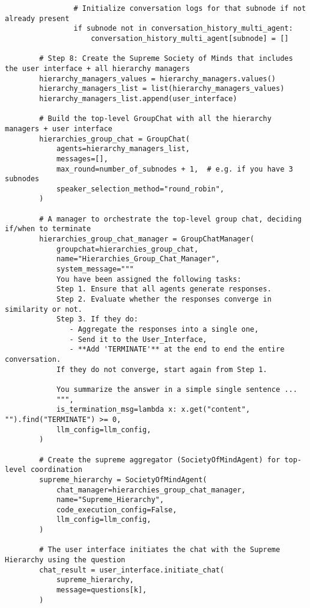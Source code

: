 \begin{lstlisting}
                # Initialize conversation logs for that subnode if not already present
                if subnode not in conversation_history_multi_agent:
                    conversation_history_multi_agent[subnode] = []

        # Step 8: Create the Supreme Society of Minds that includes the user interface + all hierarchy managers
        hierarchy_managers_values = hierarchy_managers.values()
        hierarchy_managers_list = list(hierarchy_managers_values)
        hierarchy_managers_list.append(user_interface)

        # Build the top-level GroupChat with all the hierarchy managers + user interface
        hierarchies_group_chat = GroupChat(
            agents=hierarchy_managers_list,
            messages=[],
            max_round=number_of_subnodes + 1,  # e.g. if you have 3 subnodes
            speaker_selection_method="round_robin",
        )

        # A manager to orchestrate the top-level group chat, deciding if/when to terminate
        hierarchies_group_chat_manager = GroupChatManager(
            groupchat=hierarchies_group_chat,
            name="Hierarchies_Group_Chat_Manager",
            system_message="""
            You have been assigned the following tasks:
            Step 1. Ensure that all agents generate responses.
            Step 2. Evaluate whether the responses converge in similarity or not.
            Step 3. If they do: 
               - Aggregate the responses into a single one, 
               - Send it to the User_Interface,
               - **Add 'TERMINATE'** at the end to end the entire conversation.
            If they do not converge, start again from Step 1.

            You summarize the answer in a simple single sentence ...
            """,
            is_termination_msg=lambda x: x.get("content", "").find("TERMINATE") >= 0,
            llm_config=llm_config,
        )

        # Create the supreme aggregator (SocietyOfMindAgent) for top-level coordination
        supreme_hierarchy = SocietyOfMindAgent(
            chat_manager=hierarchies_group_chat_manager,
            name="Supreme_Hierarchy",
            code_execution_config=False,
            llm_config=llm_config,
        )

        # The user interface initiates the chat with the Supreme Hierarchy using the question
        chat_result = user_interface.initiate_chat(
            supreme_hierarchy,
            message=questions[k],
        )


\end{lstlisting}
